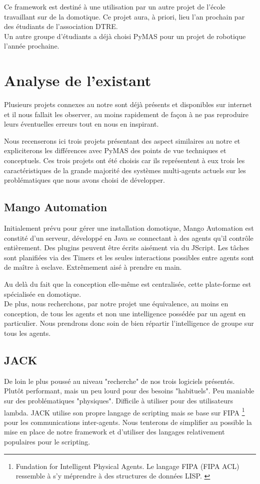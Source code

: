 \documentclass[11pt]{book}
\begin{document}
Ce framework est destiné à une utilisation par un autre projet de l'école 
travaillant sur de la domotique. Ce projet aura, à priori, lieu l'an 
prochain par des étudiants de l'association DTRE. \\
Un autre groupe d'étudiants a déjà choisi PyMAS pour un projet de 
robotique l'année prochaine.

\chapter{Analyse de l'existant}
Plusieurs projets connexes au notre sont déjà présents et disponibles sur 
internet et il nous fallait les observer, au moins rapidement de façon à ne
pas reproduire leurs éventuelles erreurs tout en nous en inspirant.

Nous recenserons ici trois projets présentant des aspect similaires au notre 
et expliciterons les différences avec PyMAS des points de vue techniques 
et conceptuels. Ces trois projets ont été choisis car ils représentent à 
eux trois les caractéristiques de la grande majorité des systèmes 
multi-agents actuels sur les problématiques que nous avons choisi de 
développer.

\section{Mango Automation}
Initialement prévu pour gérer une installation domotique, Mango Automation 
est constité d'un serveur, développé en Java se connectant à des agents qu'il
contrôle entièrement. Des plugins peuvent 
être écrits aisément via du JScript. Les tâches sont planifiées via des 
Timers et les seules interactions possibles entre agents sont de maître à 
esclave. Extrêmement aisé à prendre en main. 

Au delà du fait que la conception elle-même est centralisée, cette 
plate-forme est spécialisée en domotique.\\ 
De plus, nous recherchons, par notre projet une équivalence, au moins en 
conception, de tous les agents et non une intelligence possédée par 
un agent en particulier. Nous prendrons donc soin de bien répartir 
l'intelligence de groupe sur tous les agents.

\section{JACK}
De loin le plus poussé au niveau "recherche" de nos trois logiciels 
présentés. Plutôt performant, mais un peu lourd pour des besoins "habituels". 
Peu maniable sur des problématiques "physiques". Difficile à utiliser pour 
des utilisateurs lambda. JACK utilise son propre langage de scripting mais 
se base sur FIPA \footnote{Fundation for Intelligent Physical Agents. Le 
langage FIPA (FIPA ACL) ressemble à s'y méprendre à des structures de 
données LISP. \cite{o1998fipa}} pour les communications inter-agents.
Nous tenterons de simplifier au possible la mise en place de notre framework 
et d'utiliser des langages relativement populaires pour le scripting.
\end{document}
